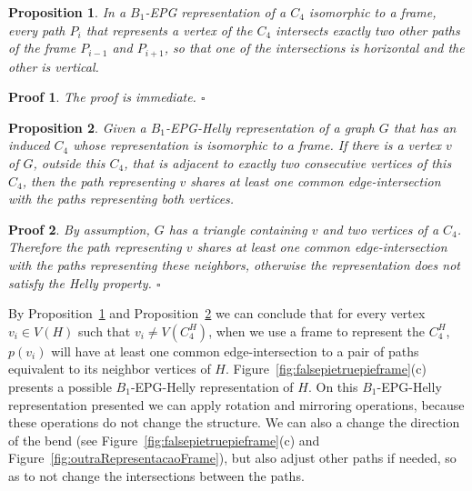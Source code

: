 \documentclass[9pt]{entcs}
\newtheorem{pro}{Proposition}[section]
\newtheorem{prove}{Proof}[section]
\begin{document}
\begin{pro}\label{lem:direcoesdiferentes}
In a $B_1$-EPG representation of a $C_4$ isomorphic to a frame, every path $P_i$ that represents a vertex of the $C_4$ intersects exactly two other paths of the frame $P_{i-1}$ and $P_{i+1}$, so that one of the intersections is horizontal and the other is vertical. %
\end{pro}

\begin{prove}
The proof is immediate.
$\square$ \end{prove}

\begin{pro}\label{lem:mesmaretasuporte}
Given a $B_1$-EPG-Helly representation of a graph $G$ that has an induced $C_4$ whose representation is isomorphic to a frame. If there is a vertex $v$ of $G$, outside this $C_4$, that is adjacent to exactly two consecutive vertices of this $C_4$, then the path representing $v$ shares at least one common edge-intersection with the paths representing both vertices.%
\end{pro}

\begin{prove}


By assumption, $G$ has a triangle containing $v$ and two vertices of a $C_4$. Therefore the path representing $v$ shares at least one common edge-intersection with the paths representing these neighbors, otherwise the representation does not satisfy the Helly property.
$\square$ \end{prove}


By Proposition~\ref{lem:direcoesdiferentes} and Proposition~\ref{lem:mesmaretasuporte} we can conclude that for every vertex $v_i \in V(H)$ such that $v_i \neq V(C_4^{H})$, when we use a frame to represent the $C_4^{H}$, $p(v_i)$ will have at least one common edge-intersection to a pair of paths equivalent to its neighbor vertices of $H$. 
Figure~\ref{fig:falsepietruepieframe}(c) presents a possible $B_{1}$-EPG-Helly representation of $H$. On this $B_{1}$-EPG-Helly representation presented we can apply rotation and mirroring operations, because these operations do not change the structure. We can also a change the direction of the bend (see Figure~\ref{fig:falsepietruepieframe}(c) and Figure~\ref{fig:outraRepresentacaoFrame}), but also adjust other paths if needed, so as to not change the intersections between the paths.
\end{document}
